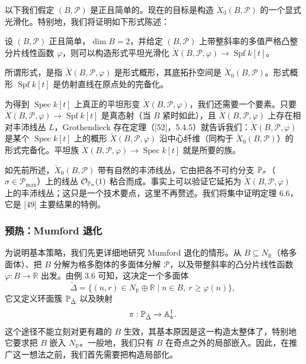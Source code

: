 以下我们假定 $(B,\mathcal{P})$ 是正且简单的。现在的目标是构造 $\check X_0(B,\mathcal{P})$ 的一个显式光滑化。特别地，我们将证明如下形式陈述：

\begin{theorem}
设 $(B,\mathcal{P})$ 正且简单，$\dim B=2$，并给定 $(B,\mathcal{P})$ 上带整斜率的多值严格凸整分片线性函数 $\varphi$，则可以构造形式平坦光滑化 $\check X(B,\mathcal{P},\varphi)\to\operatorname{Spf} k[t]$。
\end{theorem}

所谓形式，是指 $\check X(B,\mathcal{P},\varphi)$ 是形式概形，其底拓扑空间是 $\check X_0(B,\mathcal{P})$。形式概形 $\operatorname{Spf} k[t]$ 是仿射直线在原点处的完备化。

为得到 $\operatorname{Spec} k[t]$ 上真正的平坦形变 $\check X(B,\mathcal{P},\varphi)$，我们还需要一个要素。只要 $\check X(B,\mathcal{P},\varphi)\to\operatorname{Spf} k[t]$ 是真态射（当 $B$ 紧时如此），且 $\check X(B,\mathcal{P},\varphi)$ 上存在相对丰沛线丛 $L$，Grothendieck 存在定理（[52]，5.4.5）就告诉我们：$\check X(B,\mathcal{P},\varphi)$ 是某个 $\operatorname{Spec} k[t]$ 上的概形 $\check X(B,\mathcal{P},\varphi)$ 沿中心纤维（同构于 $\check X_0(B,\mathcal{P})$）的形式完备化。平坦族 $\check X(B,\mathcal{P},\varphi)\to\operatorname{Spec} k[t]$ 就是所要的族。


如先前所述，$\check X_0(B,\mathcal{P})$ 带有自然的丰沛线丛，它由把各不可约分支 $\mathbb{P}_\sigma$（$\sigma\in\mathcal{P}_{\max}$）上的线丛 $\mathcal{O}_{\mathbb{P}_\sigma}(1)$ 粘合而成。事实上可以验证它延拓为 $\check X(B,\mathcal{P},\varphi)$ 上的丰沛线丛；这只是一个技术要点，这里不再赘述。我们将集中证明定理 6.6，它是 [49] 主要结果的特例。

\subsubsection{预热：Mumford 退化}

为说明基本策略，我们先更详细地研究 Mumford 退化的情形。从 $B\subseteq N_{\mathbb{R}}$（格多面体）、把 $B$ 分解为格多胞体的多面体分解 $\mathcal{P}$，以及带整斜率的凸分片线性函数 $\varphi:B\to\mathbb{R}$ 出发。由例 3.6 可知，这决定一个多面体
\[
  \tilde\Delta=\{(n,r)\in N_{\mathbb{R}}\oplus\mathbb{R}\mid n\in B,\ r\ge\varphi(n)\},
\]
它又定义环面簇 $\mathbb{P}_{\tilde\Delta}$ 以及映射
\[
  \pi:\mathbb{P}_{\tilde\Delta}\to\mathbb{A}^1_k.
\]
这个途径不能立刻对更有趣的 $B$ 生效，其基本原因是这一构造太整体了，特别地它要求把 $B$ 嵌入 $N_{\mathbb{R}}$。一般地，我们只有 $B$ 在奇点之外的局部嵌入。因此，在推广这一想法之前，我们首先需要把构造局部化。

